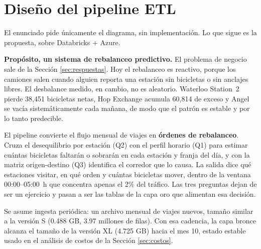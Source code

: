 \section{Diseño del pipeline ETL}
\label{sec:pipeline}

El enunciado pide únicamente el diagrama, sin implementación. Lo que sigue es la propuesta, sobre Databricks + Azure.

\textbf{Propósito, un sistema de rebalanceo predictivo.} El problema de negocio sale de la Sección \ref{sec:respuestas}. Hoy el rebalanceo es reactivo, porque los camiones salen cuando alguien reporta una estación sin bicicletas o sin anclajes libres. El desbalance medido, en cambio, no es aleatorio. Waterloo Station~2 pierde 38,451 bicicletas netas, Hop Exchange acumula 60,814 de exceso y Angel se vacía sistemáticamente cada mañana, de modo que el patrón es estable y por lo tanto predecible.

El pipeline convierte el flujo mensual de viajes en \textbf{órdenes de rebalanceo}. Cruza el desequilibrio por estación (Q2) con el perfil horario (Q1) para estimar cuántas bicicletas faltarán o sobrarán en cada estación y franja del día, y con la matriz origen-destino (Q3) identifica el corredor que lo causa. La salida dice qué estaciones visitar, en qué orden y cuántas bicicletas mover, dentro de la ventana 00:00--05:00~h que concentra apenas el 2\% del tráfico. Las tres preguntas dejan de ser un ejercicio y pasan a ser las tablas de la capa oro que alimentan esa decisión.

Se asume ingesta periódica: un archivo mensual de viajes nuevos, tamaño similar a la versión S (0.488 GB, 3.97 millones de filas). Con esa cadencia, la capa bronce alcanza el tamaño de la versión XL (4.725 GB) hacia el mes 10, estado estable usado en el análisis de costos de la Sección \ref{sec:costos}.

